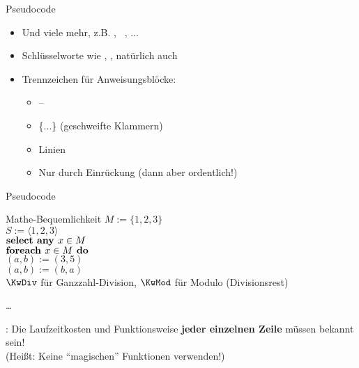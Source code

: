 \begin{frame}{Pseudocode}
	\begin{itemize}
		\large
		\item Und viele mehr, z.B. , \KwFor\ \KwEach, ...
		\item Schlüsselworte wie \KwContinue, \KwBreak,  natürlich auch
		\item Trennzeichen für Anweisungsblöcke:\\
		\begin{itemize}
			\item {} -- 
			\item \{...\} \quad  (geschweifte Klammern)
			\item Linien
			\item Nur durch Einrückung (dann aber ordentlich!)
		\end{itemize}
	\end{itemize}
\end{frame}

\begin{frame}{Pseudocode}
	\begin{exampleblock}{Mathe-Bequemlichkeit}
		$M := \{1, 2, 3\}$  \\
		$S := \langle1, 2, 3\rangle$  \\
		$\KwSty{select any } x \in M$ \\
		$\KwSty{foreach } x \in M \KwSty{ do}$ \\
		$(a, b) := (3, 5)$  \\
		$(a, b) := (b, a)$  \\
		$\KwDiv$ für Ganzzahl-Division, $\KwMod$ für Modulo (Divisionsrest) \\
		\begin{center}
			\vspace{-\baselineskip}\dots
		\end{center}
	\end{exampleblock}
	: Die Laufzeitkosten und Funktionsweise \textbf{jeder einzelnen Zeile} müssen bekannt sein! \\
	(Heißt: Keine \enquote{magischen} Funktionen verwenden!)
\end{frame}

